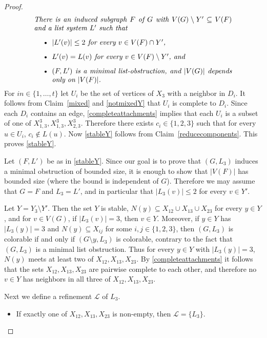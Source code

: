 \documentclass[11pt]{article}
\begin{document}
\begin{proof}
\begin{equation}
\label{stableY}
\begin{minipage}[c]{0.8 \textwidth} \em
There is an induced subgraph $F$ of $G$ with 
$V(G) \setminus Y' \subseteq V(F)$ and a list system $L'$ such that
\begin{itemize}  
\item $|L'(v)| \leq 2$ for every $v \in V(F) \cap Y'$,
\item $L'(v)=L(v)$ for every $v \in V(F) \setminus Y'$, and
\item $(F,L')$ is a minimal list-obstruction, and $|V(G)|$ depends only on 
$|V(F)|$. 
\end{itemize}
\end{minipage}
\end{equation}
For $in \in \{1, \ldots, t\}$ let $U_i$ be the set of vertices of $X_3$ with a 
neighbor in $D_i$.
It follows from Claim~\ref{mixed} and \eqref{notmixedY} that
$U_i$ is complete to $D_i$.
Since each $D_i$ contains an edge, \eqref{completeattachments} implies
that  each $U_i$ is a subset of one of $X^3_{1,3}, X^3_{1,3},X^3_{2,3}$. 
Therefore there exists $c_i \in \{1,2,3\}$ such that for every $u \in U_i$,
$c_i \not \in L(u)$. 
Now \eqref{stableY} follows from Claim~\ref{reducecomponents}.
This proves \eqref{stableY}.

\bigskip

Let $(F,L')$ be as in \eqref{stableY}. 
Since our goal is to prove that $(G,L_3)$ induces a minimal obstruction of
bounded size, it is enough to show that $|V(F)|$ has bounded size  (where the 
bound is independent of $G$). 
Therefore we may assume that $G=F$ and $L_3=L'$, and in particular that 
$|L_3(v)| \leq 2$ for every $v \in Y'$. 

Let $Y=Y_3\setminus Y'$. Then the set $Y$ is stable, 
$N(y) \subseteq X_{12} \cup X_{13} \cup X_{23}$ for every $y \in Y$, and  for
$v \in V(G)$, if $|L_3(v)|=3$, then $v \in Y$. Moreover, if
$y \in Y$ has $|L_3(y)|=3$ and $N(y) \subseteq X_{ij}$ for some $i,j \in \{1,2,3\}$, then $(G,L_3)$ is colorable if and only if $(G\setminus y,L_3)$ is colorable,
contrary to the fact that $(G,L_3)$ is a minimal list obstruction. 
Thus for every $y \in Y$
with $|L_3(y)|=3$, $N(y)$ meets at least two of $X_{12},X_{13},X_{23}$.
By \eqref{completeattachments} it follows that the sets $X_{12},X_{13},X_{23}$
are pairwise complete to each other, and therefore no $v \in Y$ has neighbors
in all three of $X_{12},X_{13},X_{23}$. 


Next we define a refinement $\mathcal{L}$ of $L_3$. 
\begin{itemize}
\item If exactly one of $X_{12},X_{13},X_{23}$ is non-empty, then $\mathcal{L}=\{L_3\}$.


\end{itemize}
\end{proof}
\end{document}
